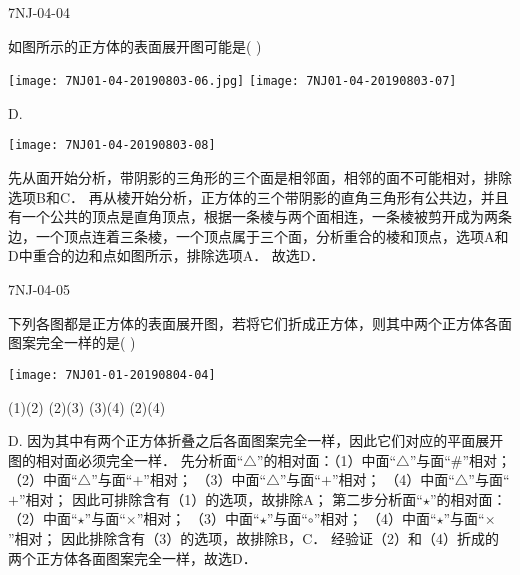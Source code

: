 \begin{defproblem}{7NJ-04-04}%
\begin{onlyproblem}%
如图所示的正方体的表面展开图可能是(    ) 
\begin{center}
\texttt{[image: 7NJ01-04-20190803-06.jpg]}
\texttt{[image: 7NJ01-04-20190803-07]}
\end{center}


\end{onlyproblem}%
\begin{onlysolution}%
\begin{solution}%
D.
\begin{center}
\texttt{[image: 7NJ01-04-20190803-08]}
\end{center}
先从面开始分析，带阴影的三角形的三个面是相邻面，相邻的面不可能相对，排除选项B和C． 再从棱开始分析，正方体的三个带阴影的直角三角形有公共边，并且有一个公共的顶点是直角顶点，根据一条棱与两个面相连，一条棱被剪开成为两条边，一个顶点连着三条棱，一个顶点属于三个面，分析重合的棱和顶点，选项A和D中重合的边和点如图所示，排除选项A．    故选D． 
\end{solution}%
\end{onlysolution}%
\end{defproblem}



\begin{defproblem}{7NJ-04-05}%
\begin{onlyproblem}%
下列各图都是正方体的表面展开图，若将它们折成正方体，则其中两个正方体各面图案完全一样的是(    ) 
\begin{center}
\texttt{[image: 7NJ01-01-20190804-04]}
\end{center}

\xx
{(1)(2)}
{(2)(3)}
{(3)(4)}
{(2)(4)}

\end{onlyproblem}%
\begin{onlysolution}%
\begin{solution}%
D.
因为其中有两个正方体折叠之后各面图案完全一样，因此它们对应的平面展开图的相对面必须完全一样．
先分析面“$\triangle$”的相对面：（1）中面“$\triangle$”与面“\#”相对； （2）中面“$\triangle$”与面“$+$”相对； （3）中面“$\triangle$”与面“$+$”相对； （4）中面“$\triangle$”与面“$+$”相对； 因此可排除含有（1）的选项，故排除A；
第二步分析面“$\star$”的相对面： （2）中面“$\star$”与面“$\times$”相对； （3）中面“$\star$”与面“$\circ$”相对； （4）中面“$\star$”与面“$\times$”相对； 因此排除含有（3）的选项，故排除B，C． 经验证（2）和（4）折成的两个正方体各面图案完全一样，故选D．
\end{solution}%
\end{onlysolution}%
\end{defproblem}




